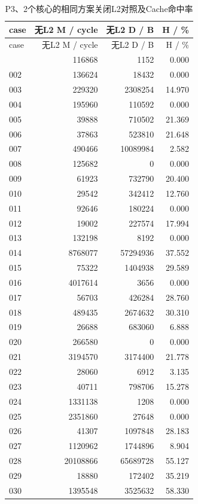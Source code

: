 \documentclass[anonymous,notoc]{gmcm2026}
\begin{document}
\begin{longtable}{lrrr}
\caption{P3、2个核心的相同方案关闭L2对照及Cache命中率}\\
\toprule
case & 无L2 M / cycle & 无L2 D / B & H / \%\\\midrule
\endfirsthead
\toprule
case & 无L2 M / cycle & 无L2 D / B & H / \%\\\midrule
\endhead
\bottomrule\endfoot
001 & 116868 & 1152 & 0.000 \\
002 & 136624 & 18432 & 0.000 \\
003 & 229320 & 2308254 & 14.970 \\
004 & 195960 & 110592 & 0.000 \\
005 & 39888 & 710502 & 21.369 \\
006 & 37863 & 523810 & 21.648 \\
007 & 490466 & 10089984 & 2.582 \\
008 & 125682 & 0 & 0.000 \\
009 & 61923 & 732790 & 20.400 \\
010 & 29542 & 342412 & 12.760 \\
011 & 92646 & 180224 & 0.000 \\
012 & 19002 & 227574 & 17.994 \\
013 & 132198 & 8192 & 0.000 \\
014 & 8768077 & 57294936 & 37.552 \\
015 & 75322 & 1404938 & 29.589 \\
016 & 4017614 & 3656 & 0.000 \\
017 & 56703 & 426284 & 28.760 \\
018 & 489435 & 2674632 & 30.310 \\
019 & 26688 & 683060 & 6.888 \\
020 & 266580 & 0 & 0.000 \\
021 & 3194570 & 3174400 & 21.778 \\
022 & 28060 & 6912 & 3.135 \\
023 & 40711 & 798706 & 15.278 \\
024 & 1331138 & 1208 & 0.000 \\
025 & 2351860 & 27648 & 0.000 \\
026 & 41307 & 1097848 & 28.183 \\
027 & 1120962 & 1744896 & 8.904 \\
028 & 20108866 & 65689728 & 55.127 \\
029 & 18880 & 172402 & 35.219 \\
030 & 1395548 & 3525632 & 58.330 \\

\end{longtable}
\end{document}
